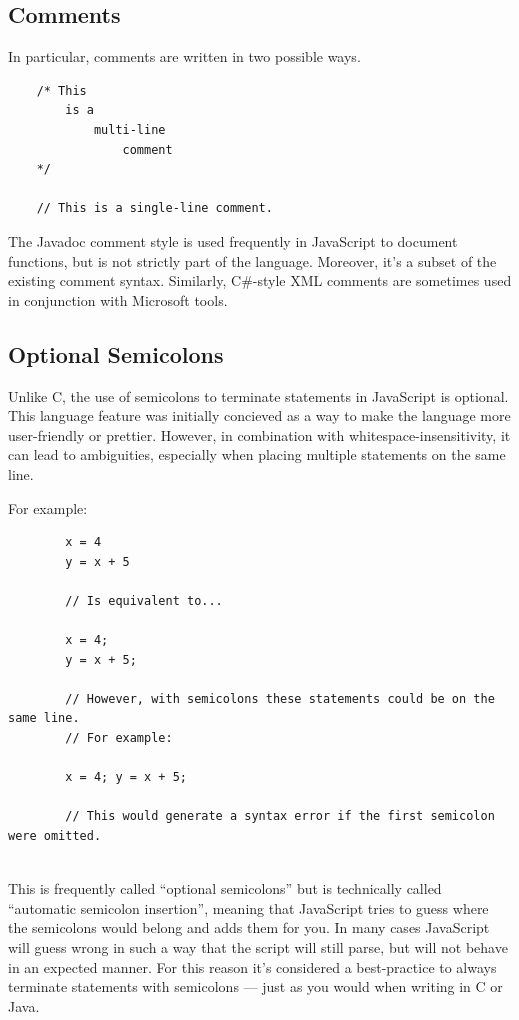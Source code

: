 \documentclass[11pt,letter]{book}
\begin{document}
    \subsection{Comments}
    In particular, comments are written in two possible ways.
    
    \begin{verbatim}
    /* This
        is a
            multi-line
                comment
    */
     
    // This is a single-line comment.
    \end{verbatim}
    
    The Javadoc comment style is used frequently in JavaScript to document functions, but is not 
    strictly part of the language. Moreover, it's a subset of the existing comment syntax. 
    Similarly, C\#-style XML comments are sometimes used in conjunction with Microsoft tools.
    
    \subsection{Optional Semicolons}
    Unlike C, the use of semicolons to terminate statements in JavaScript is optional. This language 
    feature was initially concieved as a way to make the language more user-friendly or prettier. 
    However, in combination with whitespace-insensitivity, it can lead to ambiguities, especially 
    when placing multiple statements on the same line.
    
    For example:
    
    \begin{verbatim}
        x = 4
        y = x + 5
        
        // Is equivalent to...
        
        x = 4;
        y = x + 5;
        
        // However, with semicolons these statements could be on the same line.
        // For example:
        
        x = 4; y = x + 5;
        
        // This would generate a syntax error if the first semicolon were omitted.
        
    \end{verbatim}
    
    This is frequently called ``optional semicolons'' but is technically called ``automatic 
    semicolon insertion'', meaning that JavaScript tries to guess where the semicolons would belong 
    and adds them for you. In many cases JavaScript will guess wrong in such a way that the script 
    will still parse, but will not behave in an expected manner. For this reason it's considered a
    best-practice to always terminate statements with semicolons --- just as you would when writing 
    in C or Java. 
    
\end{document}
